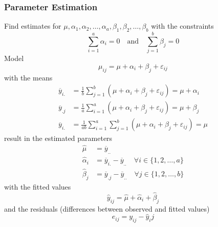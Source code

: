 \documentclass[11pt]{article}
\theoremstyle{definition}
\newcommand*\samplemean[1]{\overline{#1}}
\begin{document}
\subsubsection{Parameter Estimation}
Find estimates for $\mu,\alpha_1,\alpha_2,\dots,\alpha_a,\beta_1,\beta_2,\dots,\beta_b$ with the constraints
\begin{equation*}
	\sum_{i=1}^{a}\alpha_i = 0\quad\text{and}\quad\sum_{j=1}^{b}\beta_j = 0
\end{equation*}
Model
\begin{equation*}
	\mu_{ij} = \mu + \alpha_i + \beta_j + \varepsilon_{ij}
\end{equation*}
with the means
\begin{align*}
	\samplemean{y}_{i.} &= \frac{1}{b}\sum_{j=1}^{b}\left(\mu + \alpha_i + \beta_j + \varepsilon_{ij}\right) = \mu+\alpha_i\\
	\samplemean{y}_{.j} &= \frac{1}{a}\sum_{i=1}^{a}\left(\mu + \alpha_i + \beta_j + \varepsilon_{ij}\right) = \mu+\beta_j\\
	\samplemean{y}_{i.} &= \frac{1}{ab}\sum_{i=1}^{a}\sum_{j=1}^{b}\left(\mu + \alpha_i + \beta_j + \varepsilon_{ij}\right) = \mu
\end{align*}
result in the estimated parameters
\begin{align*}
	\hat{\mu} &= \samplemean{y}_{..}\\
	\hat{\alpha}_i &= \samplemean{y}_{i.} -\samplemean{y}_{..}\quad\forall i\in\{1,2,\dots,a\}\\
	\hat{\beta}_j &= \samplemean{y}_{.j} -\samplemean{y}_{..}\quad\forall j\in\{1,2,\dots,b\}
\end{align*}
with the fitted values
\begin{equation*}
	\hat{y}_{ij} = \hat{\mu} + \hat{\alpha}_i + \hat{\beta}_j
\end{equation*}
and the residuals (differences between observed and fitted values)
\begin{equation*}
	e_{ij} = y_{ij} - \hat{y}_ij
\end{equation*}
\end{document}
